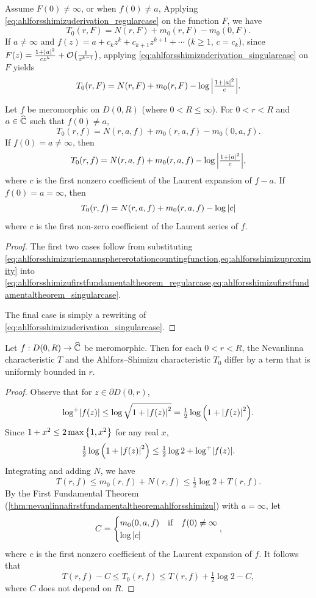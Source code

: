 Assume \(F(0)\neq\infty\), or when \(f(0)\neq a\), Applying \cref{eq:ahlforsshimizuderivation_regularcase} on the function \(F\), we have
\begin{equation}
    T_0(r,F)=N(r,F)+m_0(r,F)-m_0(0,F).\label{eq:ahlforsshimizufirstfundamentaltheorem_regularcase}
\end{equation}
If \(a\neq\infty\) and \(f(z)=a+c_kz^k+c_{k+1}z^{k+1}+\cdots\) (\(k\geq1\), \(c=c_k\)), since \(F(z)=\tfrac{1+\abs{a}^2}{cz^k}+\order{\tfrac1{z^{k-1}}}\), applying \cref{eq:ahlforsshimizuderivation_singularcase} on \(F\) yields
\begin{equation}
    T_0(r,F)=N(r,F)+m_0(r,F)-\log\abs{\tfrac{1+\abs{a}^2}{c}}.\label{eq:ahlforsshimizufirstfundamentaltheorem_singularcase}
\end{equation}
\begin{theorem}\label{thm:nevanlinnafirstfundamentaltheoremahlforsshimizu}
    Let \(f\) be meromorphic on \(D(0,R)\) (where \(0<R\leq\infty\)). For \(0<r<R\) and \(a\in\widehat{\mathbb{C}}\) such that \(f(0)\neq a\),
    \[T_0(r,f)=N(r,a,f)+m_0(r,a,f)-m_0(0,a,f).\]
    If \(f(0)=a\neq\infty\), then \[T_0(r,f)=N(r,a,f)+m_0(r,a,f)-\log\abs{\tfrac{1+\abs{a}^2}{c}},\] where \(c\) is the first nonzero coefficient of the Laurent expansion of \(f-a\). If \(f(0)=a=\infty\), then \[T_0(r,f)=N(r,a,f)+m_0(r,a,f)-\log\abs{c}\] where \(c\) is the first non-zero coefficient of the Laurent series of \(f\).
\end{theorem}
\begin{proof}
    The first two cases follow from substituting \cref{eq:ahlforsshimizuriemannsphererotationcountingfunction,eq:ahlforsshimizuproximity} into \cref{eq:ahlforsshimizufirstfundamentaltheorem_regularcase,eq:ahlforsshimizufirstfundamentaltheorem_singularcase}.

    The final case is simply a rewriting of \cref{eq:ahlforsshimizuderivation_singularcase}.
\end{proof}
\begin{theorem}
    Let \(f:D(0,R)\to\widehat{\mathbb{C}}\) be meromorphic. Then for each \(0<r<R\), the Nevanlinna characteristic \(T\) and the Ahlfors--Shimizu characteristic \(T_0\) differ by a term that is uniformly bounded in \(r\).
\end{theorem}
\begin{proof}
    Observe that for \(z\in\partial D(0,r)\), \[\mathop{\log^+\!} \abs{f(z)}\leq\log\sqrt{1+\abs{f(z)}^2}=\tfrac12\log\qty(1+\abs{f(z)}^2).\]
    Since \(1+x^2\leq2\max\qty{1,x^2}\) for any real \(x\), \[\tfrac12\log\qty(1+\abs{f(z)}^2)\leq\tfrac12\log2+\mathop{\log^+\!} \abs{f(z)}.\] Integrating and adding \(N\), we have \[T(r,f)\leq m_0(r,f)+N(r,f)\leq\tfrac12\log 2+T(r,f).\]
    By the First Fundamental Theorem (\cref{thm:nevanlinnafirstfundamentaltheoremahlforsshimizu}) with \(a=\infty\), let \[C=
        \begin{cases}
            m_0(0,a,f)&\qif*f(0)\neq\infty\\
            \log\abs{c}
    \end{cases},\] where \(c\) is the first nonzero coefficient of the Laurent expansion of \(f\).
    It follows that \[T(r,f)-C\leq T_0(r,f)\leq T(r,f)+\tfrac12\log2-C,\] where \(C\) does not depend on \(R\).
\end{proof}

